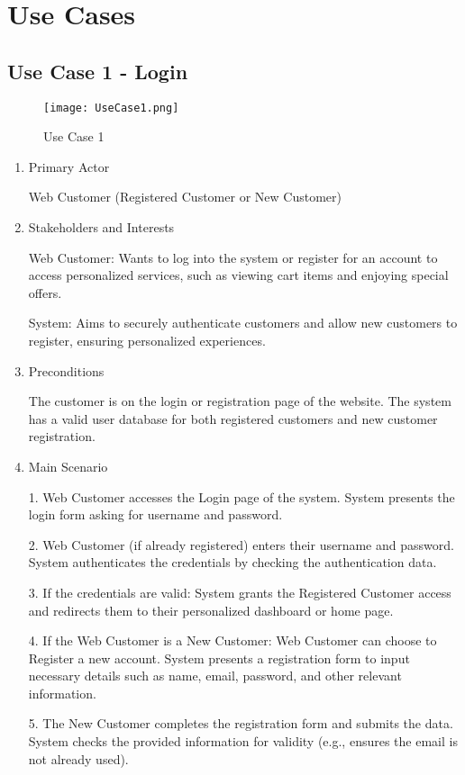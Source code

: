 \documentclass[conference]{IEEEtran}
\begin{document}
\section{Use Cases}

\subsection{Use Case 1 - Login}

\begin{figure}[H]
    \centering
    \texttt{[image: UseCase1.png]}
    \caption{Use Case 1}
    \label{fig:use-case-1}
\end{figure}

\begin{enumerate}
\setlength{\parindent}{2ex}
\item Primary Actor

Web Customer (Registered Customer or New Customer)
\item Stakeholders and Interests

Web Customer: Wants to log into the system or register for an account to access personalized services, such as viewing cart items and enjoying special offers.

System: Aims to securely authenticate customers and allow new customers to register, ensuring personalized experiences.
\item Preconditions

The customer is on the login or registration page of the website.
The system has a valid user database for both registered customers and new customer registration.
\item Main Scenario

1. Web Customer accesses the Login page of the system.
System presents the login form asking for username and password.

2. Web Customer (if already registered) enters their username and password.
System authenticates the credentials by checking the authentication data.

3. If the credentials are valid:
System grants the Registered Customer access and redirects them to their personalized dashboard or home page.

4. If the Web Customer is a New Customer:
Web Customer can choose to Register a new account.
System presents a registration form to input necessary details such as name, email, password, and other relevant information.

5. The New Customer completes the registration form and submits the data.
System checks the provided information for validity (e.g., ensures the email is not already used).


\end{enumerate}
\end{document}
